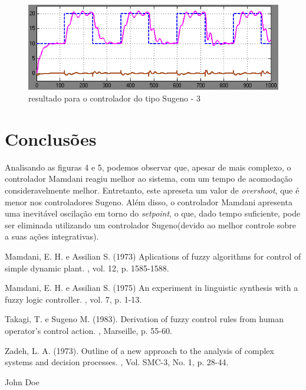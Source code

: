\documentclass[conference]{IEEEtran}
\begin{document}
\begin{figure}[!h]
    \centering
    \includegraphics[scale=0.2]{sugeno2.png}
    \caption { resultado para o controlador do tipo Sugeno - 3 }
\end{figure}

\ifCLASSOPTIONcaptionsoff
  \newpage
\fi

\section{Conclusões}

Analisando as figuras 4 e 5, podemos observar que,  apesar de mais complexo, o controlador Mamdani reagiu melhor ao sistema, com um tempo de acomodação consideravelmente melhor. Entretanto, este apreseta um valor de \textit{overshoot}, que é menor nos controladores Sugeno. Além disso, o controlador Mamdani apresenta uma inevitável oscilação em torno do \textit{setpoint}, o que, dado tempo suficiente, pode ser eliminada utilizando um controlador Sugeno(devido ao melhor controle sobre a suas ações integrativas).

\begin{thebibliography}{1}
Mamdani, E. H. e Assilian S. (1973)
\newblock Aplications of fuzzy algorithms for control of simple dynamic plant.
, vol. 12, p. 1585-1588.

Mamdani, E. H. e Assilian S. (1975)
\newblock An experiment in linguistic synthesis with a fuzzy logic controller.
, vol. 7, p. 1-13.

Takagi, T. e Sugeno M. (1983).
\newblock Derivation of fuzzy control rules from human operator’s control action.
, Marseille, p. 55-60.

Zadeh, L. A. (1973).
\newblock Outline of a new approach to the analysis of complex systems and decision processes.
, Vol. SMC-3, No. 1, p. 28-44.

\end{thebibliography}

\begin{IEEEbiography}{John Doe}
\blindtext
\end{IEEEbiography}
\end{document}
